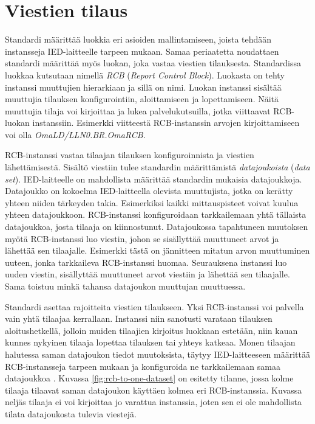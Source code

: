 \section{Viestien tilaus}
Standardi määrittää luokkia eri asioiden mallintamiseen, joista tehdään instansseja IED-laitteelle tarpeen mukaan. Samaa periaatetta noudattaen standardi määrittää myös luokan, joka vastaa viestien tilauksesta. Standardissa luokkaa kutsutaan nimellä \emph{RCB} (\emph{Report Control Block}). Luokasta on tehty instanssi muuttujien hierarkiaan ja sillä on nimi. Luokan instanssi sisältää muuttujia tilauksen konfigurointiin, aloittamiseen ja lopettamiseen. Näitä muuttujia tilaja voi kirjoittaa ja lukea palvelukutsuilla, jotka viittaavat RCB-luokan instanssiin. Esimerkki viitteestä RCB-instanssin arvojen kirjoittamiseen voi olla \emph{OmaLD/LLN0.BR.OmaRCB}. \mbox{\cite[s.~95--97]{IEC61850-7-2}}

RCB-instanssi vastaa tilaajan tilauksen konfiguroinnista ja viestien lähettämisestä. Sisältö viestiin tulee standardin määrittämistä \emph{datajoukoista} (\emph{data set}). IED-laitteelle on mahdollista määrittää standardin mukaisia datajoukkoja. Datajoukko on kokoelma IED-laitteella olevista muuttujista, jotka on kerätty yhteen niiden tärkeyden takia. Esimerkiksi kaikki mittauspisteet voivat kuulua yhteen datajoukkoon. RCB-instanssi konfiguroidaan tarkkailemaan yhtä tällaista datajoukkoa, josta tilaaja on kiinnostunut. Datajoukossa tapahtuneen muutoksen myötä RCB-instanssi luo viestin, johon se sisällyttää muuttuneet arvot ja lähettää sen tilaajalle. Esimerkki tästä on jännitteen mitatun arvon muuttuminen uuteen, jonka tarkkaileva RCB-instanssi huomaa. Seurauksena instanssi luo uuden viestin, sisällyttää muuttuneet arvot viestiin ja lähettää sen tilaajalle. Sama toistuu minkä tahansa datajoukon muuttujan muuttuessa. \mbox{\cite[s.~93]{IEC61850-7-2}}

Standardi asettaa rajoitteita viestien tilaukseen. Yksi RCB-instanssi voi palvella vain yhtä tilaajaa kerrallaan. Instanssi niin sanotusti varataan tilauksen aloitushetkellä, jolloin muiden tilaajien kirjoitus luokkaan estetään, niin kauan kunnes nykyinen tilaaja lopettaa tilauksen tai yhteys katkeaa. Monen tilaajan halutessa saman datajoukon tiedot muutoksista, täytyy IED-laitteeseen määrittää RCB-instansseja tarpeen mukaan ja konfiguroida ne tarkkailemaan samaa datajoukkoa \cite[s.~93]{IEC61850-7-2}. Kuvassa \ref{fig:rcb-to-one-dataset} on esitetty tilanne, jossa kolme tilaaja tilaavat saman datajoukon käyttäen kolmea eri RCB-instanssia. Kuvassa neljäs tilaaja ei voi kirjoittaa jo varattua instanssia, joten sen ei ole mahdollista tilata datajoukosta tulevia viestejä.

